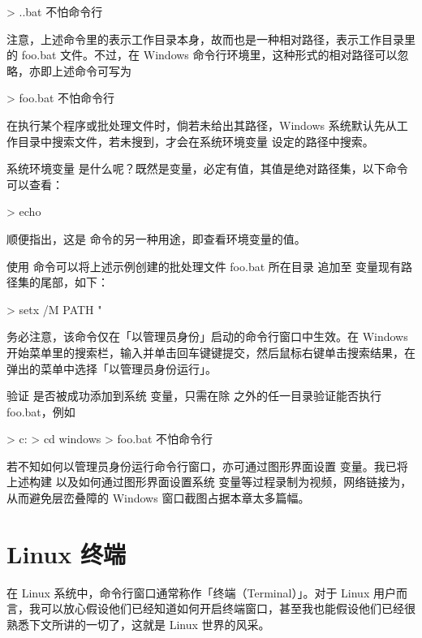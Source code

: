 {\startmycmd
> .\foo.bat
不怕命令行
\stopmycmd

\noindent 注意，上述命令里的表示工作目录本身，故而也是一种相对路径，表示工作目录里的 foo.bat 文件。不过，在 Windows 命令行环境里，这种形式的相对路径可以忽略，亦即上述命令可写为

\startmycmd
> foo.bat
不怕命令行
\stopmycmd

\noindent 在执行某个程序或批处理文件时，倘若未给出其路径，Windows 系统默认先从工作目录中搜索文件，若未搜到，才会在系统环境变量  设定的路径中搜索。

系统环境变量  是什么呢？既然是变量，必定有值，其值是绝对路径集，以下命令可以查看：

\startmycmd
> echo %
\stopmycmd

\noindent 顺便指出，这是  命令的另一种用途，即查看环境变量的值。

使用  命令可以将上述示例创建的批处理文件 foo.bat 所在目录  追加至  变量现有路径集的尾部，如下：

\startmycmd
> setx /M PATH "%
\stopmycmd

\noindent 务必注意，该命令仅在「以管理员身份」启动的命令行窗口中生效。在 Windows 开始菜单里的搜索栏，输入并单击回车键键提交，然后鼠标右键单击搜索结果，在弹出的菜单中选择「以管理员身份运行」。

验证  是否被成功添加到系统  变量，只需在除  之外的任一目录验证能否执行 foo.bat，例如

\startmycmd
> c:
> cd windows  
> foo.bat
不怕命令行  
\stopmycmd

若不知如何以管理员身份运行命令行窗口，亦可通过图形界面设置  变量。我已将上述构建  以及如何通过图形界面设置系统  变量等过程录制为视频，网络链接为，从而避免层峦叠障的 Windows 窗口截图占据本章太多篇幅。

\section{Linux 终端}

在 Linux 系统中，命令行窗口通常称作「终端（Terminal）」。对于 Linux 用户而言，我可以放心假设他们已经知道如何开启终端窗口，甚至我也能假设他们已经很熟悉下文所讲的一切了，这就是 Linux 世界的风采。

}
